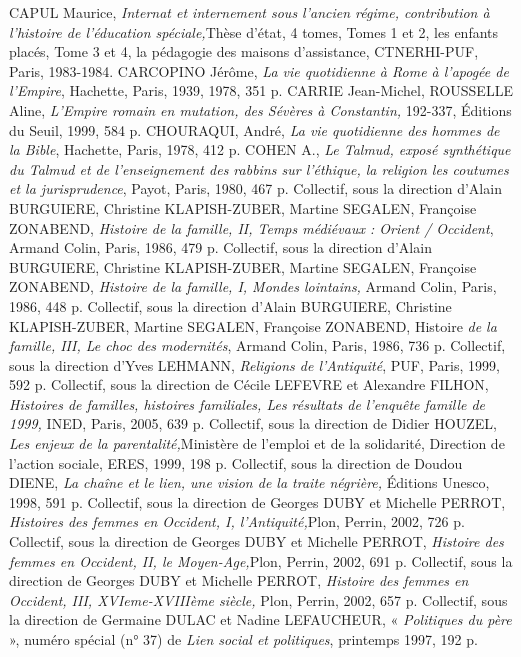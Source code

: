 CAPUL Maurice, \emph{Internat et internement sous l'ancien régime, contribution à l'histoire de l'éducation spéciale,}Thèse d'état, 4 tomes, Tomes 1 et 2, les enfants placés, Tome 3 et 4, la pédagogie des maisons d'assistance, CTNERHI-PUF, Paris, 1983-1984.
CARCOPINO Jérôme, \emph{La vie quotidienne à Rome à l'apogée de l'Empire}, Hachette, Paris, 1939, 1978, 351 p.
CARRIE Jean-Michel, ROUSSELLE Aline, \emph{L'Empire romain en mutation, des Sévères à Constantin,} 192-337, Éditions du Seuil, 1999, 584 p.
CHOURAQUI, André, \emph{La vie quotidienne des hommes de la Bible}, Hachette, Paris, 1978, 412 p.
COHEN A., \emph{Le Talmud, exposé synthétique du Talmud et de l'enseignement des rabbins sur l'éthique, la religion les coutumes et la jurisprudence}, Payot, Paris, 1980, 467 p.
Collectif, sous la direction d'Alain BURGUIERE, Christine KLAPISH-ZUBER, Martine SEGALEN, Françoise ZONABEND, \emph{Histoire de la famille, II, Temps médiévaux : Orient / Occident}, Armand Colin, Paris, 1986, 479 p.
Collectif, sous la direction d'Alain BURGUIERE, Christine KLAPISH-ZUBER, Martine SEGALEN, Françoise ZONABEND, \emph{Histoire de la famille, I, Mondes lointains,} Armand Colin, Paris, 1986, 448 p.
Collectif, sous la direction d'Alain BURGUIERE, Christine KLAPISH-ZUBER, Martine SEGALEN, Françoise ZONABEND, Histoire \emph{de la famille, III, Le choc des modernités}, Armand Colin, Paris, 1986, 736 p.
Collectif, sous la direction d'Yves LEHMANN, \emph{Religions de l'Antiquité}, PUF, Paris, 1999, 592 p.
Collectif, sous la direction de Cécile LEFEVRE et Alexandre FILHON, \emph{Histoires de familles, histoires familiales, Les résultats de l'enquête famille de 1999,} INED, Paris, 2005, 639 p.
Collectif, sous la direction de Didier HOUZEL, \emph{Les enjeux de la parentalité,}Ministère de l'emploi et de la solidarité, Direction de l'action sociale, ERES, 1999, 198 p.
Collectif, sous la direction de Doudou DIENE, \emph{La chaîne et le lien, une vision de la traite négrière,} Éditions Unesco, 1998, 591 p.
Collectif, sous la direction de Georges DUBY et Michelle PERROT, \emph{Histoires des femmes en Occident, I, l'Antiquité,}Plon, Perrin, 2002, 726 p.
Collectif, sous la direction de Georges DUBY et Michelle PERROT, \emph{Histoire des femmes en Occident, II, le Moyen-Age,}Plon, Perrin, 2002, 691 p.
Collectif, sous la direction de Georges DUBY et Michelle PERROT, \emph{Histoire des femmes en Occident, III, XVIeme-XVIIIème siècle,} Plon, Perrin, 2002, 657 p.
Collectif, sous la direction de Germaine DULAC et Nadine LEFAUCHEUR, « \emph{Politiques du père} », numéro spécial (n° 37) de \emph{Lien social et politiques}, printemps 1997, 192 p.

